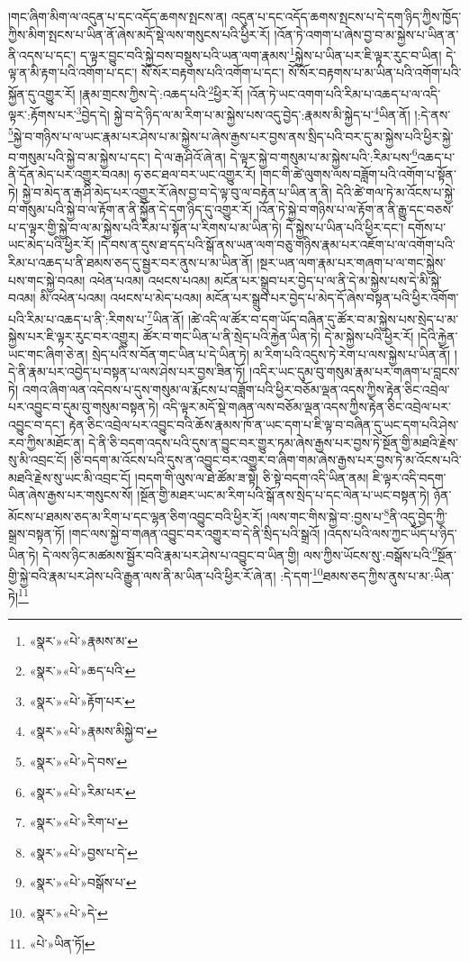 །གང་ཞིག་མིག་ལ་འདུན་པ་དང་འདོད་ཆགས་སྤངས་ན། འདུན་པ་དང་འདོད་ཆགས་སྤངས་པ་དེ་དག་ཉིད་ཀྱིས་ཁྱོད་ཀྱིས་མིག་སྤངས་པ་ཡིན་ནོ་ཞེས་མདོ་སྡེ་ལས་གསུངས་པའི་ཕྱིར་རོ། །འོན་ཏེ་འགག་པ་ཞེས་བྱ་བ་མ་སྐྱེས་པ་ཡིན་ན་ནི་འདས་པ་དང་། ད་ལྟར་བྱུང་བའི་སྐྱེ་བས་བསྡུས་པའི་ཡན་ལག་རྣམས་\footnote{«སྣར་»«པེ་»རྣམས་མ་}སྐྱེས་པ་ཡིན་པར་ཇི་ལྟར་རུང་བ་ཡིན། དེ་ལྟ་ན་མི་རྟག་པའི་འགོག་པ་དང་། སོ་སོར་བརྟགས་པའི་འགོག་པ་དང་། སོ་སོར་བརྟགས་པ་མ་ཡིན་པའི་འགོག་པའི་སྐྱོན་དུ་འགྱུར་རོ། །རྣམ་གྲངས་ཀྱིས་དེ་:འཆད་པའི་\footnote{«སྣར་»«པེ་»ཆད་པའི་}ཕྱིར་རོ། །འོན་ཏེ་ཡང་འགག་པའི་རིམ་པ་འཆད་པ་ལ་འདི་ལྟར་:རྟོགས་པར་\footnote{«སྣར་»«པེ་»རྟོག་པར་}བྱེད་དེ། སྐྱེ་བ་དེ་ཉིད་ལ་མ་རིག་པ་མ་སྐྱེས་པས་འདུ་བྱེད་:རྣམས་མི་སྐྱེད་པ་\footnote{«སྣར་»«པེ་»རྣམས་མིསྐྱེ་བ་}ཡིན་ནོ། །:དེ་ནས་\footnote{«སྣར་»«པེ་»དེ་བས་}སྐྱེ་བ་གཉིས་པ་ལ་ཡང་རྣམ་པར་ཤེས་པ་མ་སྐྱེས་པ་ཞེས་རྒྱས་པར་བྱས་ནས་སྲིད་པའི་བར་དུ་མ་སྐྱེས་པའི་ཕྱིར་སྐྱེ་བ་གསུམ་པའི་སྐྱེ་བ་མ་སྐྱེས་པ་དང་། དེ་ལ་རྒ་ཤིའོ་ཞེ་ན། དེ་ལྟར་སྐྱེ་བ་གསུམ་པ་མ་སྐྱེས་པའི་:རིམ་པས་\footnote{«སྣར་»«པེ་»རིམ་པར་}འཆད་པ་ནི་དོན་མེད་པར་འགྱུར་བའམ། ཧ་ཅང་ཐལ་བར་ཡང་འགྱུར་རོ། །གང་གི་ཚེ་ལུགས་ལས་བཟློག་པའི་འགོག་པ་སྟོན་ཏེ། སྐྱེ་བ་མེད་ན་རྒ་ཤི་མེད་པར་འགྱུར་རོ་ཞེས་བྱ་བ་དེ་ལྟ་བུ་ལ་བརྟེན་པ་ཡིན་ན་ནི། དེའི་ཚེ་གལ་ཏེ་མ་འོངས་པ་སྐྱེ་བ་གསུམ་པའི་སྐྱེ་བ་ལ་རྟོག་ན་ནི་སྐྱོན་དེ་དག་ཉིད་དུ་འགྱུར་རོ། །འོན་ཏེ་སྐྱེ་བ་གཉིས་པ་ལ་རྟོག་ན་ནི་རྒྱུ་དང་བཅས་པ་ད་ལྟར་གྱི་སྐྱེ་བ་ལ་མ་སྐྱེས་པའི་རིམ་པ་སྟོན་པ་རིགས་པ་མ་ཡིན་ཏེ། དེ་སྐྱེས་པ་ཡིན་པའི་ཕྱིར་དང་། དགོས་པ་ཡང་མེད་པའི་ཕྱིར་རོ། །དེ་བས་ན་དུས་ཐ་དད་པའི་སྒོ་ནས་ཡན་ལག་བཅུ་གཉིས་རྣམ་པར་འཇོག་པ་ལ་འགོག་པའི་རིམ་པ་འཆད་པ་ནི་ཐམས་ཅད་དུ་སྦྱར་བར་ནུས་པ་མ་ཡིན་ནོ། །སྔར་ཡན་ལག་རྣམ་པར་གཞག་པ་ལ་གང་སྐྱེས་པས་གང་སྐྱེ་བའམ། འཕེན་པའམ། འཕངས་པའམ། མངོན་པར་སྒྲུབ་པར་བྱེད་པ་ལ་ནི་དེ་མ་སྐྱེས་པས་དེ་མི་སྐྱེ་བའམ། མི་འཕེན་པའམ། འཕངས་པ་མེད་པའམ། མངོན་པར་སྒྲུབ་པར་བྱེད་པ་མེད་དོ་ཞེས་བསྟན་པའི་ཕྱིར་འགོག་པའི་རིམ་པ་འཆད་པ་ནི་:རིགས་པ་\footnote{«སྣར་»«པེ་»རིག་པ་}ཡིན་ནོ། །ཚེ་འདི་ལ་ཚོར་བ་དག་ཡོད་བཞིན་དུ་ཚོར་བ་མ་སྐྱེས་པས་སྲེད་པ་མ་སྐྱེས་པར་ཇི་ལྟར་རུང་བར་འགྱུར། ཚོར་བ་གང་ཡིན་པ་ནི་སྲེད་པའི་རྐྱེན་ཡིན་ཏེ། དེ་མ་སྐྱེས་པའི་ཕྱིར་རོ། །དེའི་རྐྱེན་ཡང་གང་ཞིག་ཅེ་ན། སྲེད་པའི་ས་བོན་གང་ཡིན་པ་དེ་ཡིན་ཏེ། མ་རིག་པའི་འདུས་ཏེ་རེག་པ་ལས་སྐྱེས་པ་ཡིན་ནོ། །དེ་ནི་རྣམ་པར་འབྱེད་པ་བསྟན་པ་ལས་ཤེས་པར་བྱས་ཟིན་ཏོ། །འདིར་ཡང་དུམ་བུ་གསུམ་རྣམ་པར་གཞག་པ་བླངས་ཏེ། འགའ་ཞིག་ལན་འདེབས་པ་དུས་གསུམ་ལ་རྨོངས་པ་བཟློག་པའི་ཕྱིར་བཅོམ་ལྡན་འདས་ཀྱིས་རྟེན་ཅིང་འབྲེལ་པར་འབྱུང་བ་དུམ་བུ་གསུམ་བསྟན་ཏེ། འདི་ལྟར་མདོ་སྡེ་གཞན་ལས་བཅོམ་ལྡན་འདས་ཀྱིས་རྟེན་ཅིང་འབྲེལ་པར་འབྱུང་བ་དང་། རྟེན་ཅིང་འབྲེལ་པར་འབྱུང་བའི་ཆོས་རྣམས་ཁོ་ན་ཡང་དག་པ་ཇི་ལྟ་བ་བཞིན་དུ་ཡང་དག་པའི་ཤེས་རབ་ཀྱིས་མཐོང་ན། དེ་ནི་ཅི་བདག་འདས་པའི་དུས་ན་བྱུང་བར་གྱུར་ཏམ་ཞེས་རྒྱས་པར་བྱས་ཏེ་སྔོན་གྱི་མཐའི་རྗེས་སུ་མི་འབྲང་ངོ། །ཅི་བདག་མ་འོངས་པའི་དུས་ན་འབྱུང་བར་འགྱུར་བ་ཞིག་གམ་ཞེས་རྒྱས་པར་བྱས་ཏེ་མ་འོངས་པའི་མཐའི་རྗེས་སུ་ཡང་མི་འབྲང་ངོ། །བདག་གི་ལུས་ལ་ཐེ་ཚོམ་ཟ་སྟེ། ཅི་སྟེ་བདག་འདི་ཡིན་ནམ། ཇི་ལྟར་འདི་བདག་ཡིན་ཞེས་རྒྱས་པར་གསུངས་སོ། །སྔོན་གྱི་མཐར་ཡང་མ་རིག་པའི་སྒོ་ནས་སྲེད་པ་དང་ལེན་པ་ཡང་བསྟན་ཏེ། ཉོན་མོངས་པ་ཐམས་ཅད་མ་རིག་པ་དང་ལྷན་ཅིག་འབྱུང་བའི་ཕྱིར་རོ། །ལས་གང་གིས་སྐྱེ་བ་:བྱས་པ་\footnote{«སྣར་»«པེ་»བྱས་པ་དེ་}ནི་འདུ་བྱེད་ཀྱི་སྒྲས་བསྟན་ཏོ། །གང་ལས་སྐྱེ་བ་གཞན་འབྱུང་བར་འགྱུར་བ་དེ་ནི་སྲིད་པའི་སྒྲའོ། །འདས་པའི་ལས་ཀྱང་ཡོད་པ་ཉིད་ཡིན་ཏེ། དེ་ལས་ཉིང་མཚམས་སྦྱོར་བའི་རྣམ་པར་ཤེས་པ་འབྱུང་བ་ཡིན་གྱི། ལས་ཀྱིས་ཡོངས་སུ་:བསྒོས་པའི་\footnote{«སྣར་»«པེ་»བསྒོས་པ་}སྔོན་གྱི་སྐྱེ་བའི་རྣམ་པར་ཤེས་པའི་རྒྱུན་ལས་ནི་མ་ཡིན་པའི་ཕྱིར་རོ་ཞེ་ན། :དེ་དག་\footnote{«སྣར་»«པེ་»དེ་}ཐམས་ཅད་ཀྱིས་ནུས་པ་མ་:ཡིན་ཏེ།\footnote{«པེ་»ཡིན་ཏོ།} 